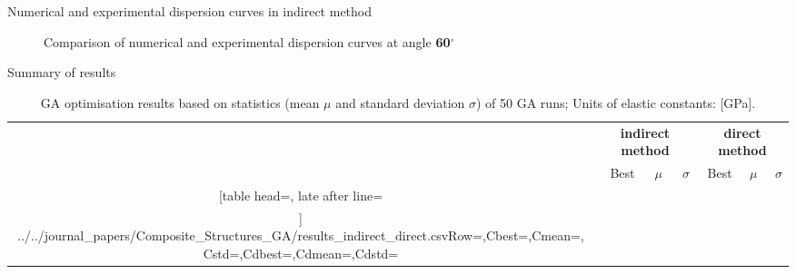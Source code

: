 \documentclass[10pt]{beamer} %
\begin{document}
\begin{frame}[t,label=frame25]{Numerical and experimental dispersion curves in \alert{indirect} method}
\begin{figure}
{		\caption{\hspace{\myindenta}Comparison of numerical and experimental dispersion curves at angle \textbf{60}$^{\circ}$ }
	}
	\label{fig:numexp}
\end{figure}
\end{frame}
\begin{frame}[t,label=frame26]{Summary of results}
\begin{table}[h]
	\renewcommand{\arraystretch}{1.3}
	\centering \footnotesize
	\caption{GA optimisation results based on statistics (mean $\mu$ and standard deviation $\sigma$) of 50 GA runs; Units of  elastic constants: [GPa].}	
	\begin{tabular}{crrrrrr} \toprule
		&\multicolumn{3}{c}{\textbf{indirect method}} & \multicolumn{3}{c}{\textbf{direct method} }\\
		\cmidrule(lr){2-4} \cmidrule(lr){5-7} 
		&Best & $\mu$ & $\sigma$& Best& $\mu$ & $\sigma$\\
		\cmidrule(lr){2-4} \cmidrule(lr){5-7} 
		\csvreader[table head=\toprule ,
		late after line=\\ ]%
		{../../journal_papers/Composite_Structures_GA/results_indirect_direct.csv}{Row=\constants,Cbest=\cbest,Cmean=\cmean,Cstd=\cstd,Cdbest=\cdbest,Cdmean=\cdmean,Cdstd=\cdstd}%
		{\constants & \cbest & \cmean & \cstd& \cdbest & \cdmean & \cdstd}%
		\bottomrule
	\end{tabular}	
	\label{tab:csv_results}
\end{table}
\end{frame}
\end{document}
